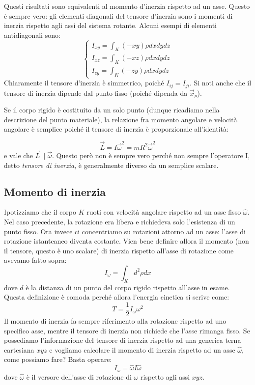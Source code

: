 \documentclass[a4paper,openany]{article}
\begin{document}
	Questi risultati sono equivalenti al momento d'inerzia rispetto ad un asse. Questo è sempre vero: gli elementi diagonali del tensore d'inerzia sono i momenti di inerzia rispetto agli assi del sistema rotante. Alcuni esempi di elementi antidiagonali sono:
	\begin{equation}\label{key}
		\begin{cases}
			I_{xy} = \int_{K}(-xy)\rho dxdydz  \\
			I_{xz} = \int_{K}(-xz)\rho dxdydz \\
			I_{zy} = \int_{K}(-zy)\rho dxdydz 
		\end{cases}
	\end{equation}
	Chiaramente il tensore d'inerzia è simmetrico, poiché $I_{ij} = I_{ji}$. Si noti anche che il tensore di inerzia dipende dal punto fisso (poiché dipenda da $\vec{x}_p$).
	
	Se il corpo rigido è costituito da un solo punto (dunque ricadiamo nella descrizione del punto materiale), la relazione fra momento angolare e velocità angolare è semplice poiché il tensore di inerzia è proporzionale all'identità:
	
	$$
	\vec{L} = I\vec{\omega}^{2} = mR^{2} \vec{\omega}^{2}
	$$
	e vale che $\vec{L} \parallel \vec{\omega}$. Questo però non è sempre vero perché non sempre l'operatore I, detto \textit{tensore di inerzia}, è generalmente diverso da un semplice scalare.
	\subsection{Momento di inerzia}
	Ipotizziamo che il corpo $K$ ruoti con velocità angolare rispetto ad un asse fisso $\hat{\omega}$. Nel caso precedente, la rotazione era libera e richiedeva solo l'esistenza di un punto fisso. Ora invece ci concentriamo su rotazioni attorno ad un asse: l'asse di rotazione istanteaneo diventa costante. Vien bene definire allora il momento (non il tensore, questo è uno scalare) di inerzia rispetto all'asse di rotazione come avevamo fatto sopra:
	$$
	I_{\omega} = \int_{K}d^{2}\rho dx
	$$
	dove $d$ è la distanza di un punto del corpo rigido rispetto all'asse in esame. Questa definizione è comoda perché allora l'energia cinetica si scrive come:
	\begin{equation}
		T = \dfrac{1}{2}I_{\omega}\omega^2
	\label{MomInerzia}
	\end{equation}
	Il momento di inerzia fa sempre riferimento alla rotazione rispetto ad uno specifico asse, mentre il tensore di inerzia non richiede che l'asse rimanga fisso. Se possediamo l'informazione del tensore di inerzia rispetto ad una generica terna cartesiana $xyz$ e vogliamo calcolare il momento di inerzia rispetto ad un asse $\hat{\omega}$, come possiamo fare? Basta operare:
	$$
	I_{\omega} = \hat{\omega}I\hat{\omega}
	$$
	dove $\hat\omega$ è il versore dell'asse di rotazione di $\omega$ rispetto agli assi $xyz$.
	
\end{document}
